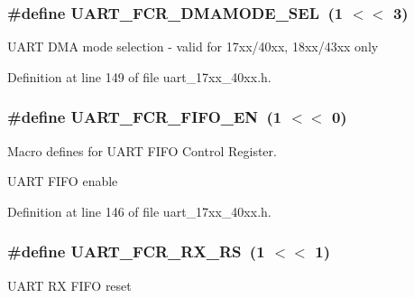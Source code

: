 \subsubsection[{\texorpdfstring{U\+A\+R\+T\+\_\+\+F\+C\+R\+\_\+\+D\+M\+A\+M\+O\+D\+E\+\_\+\+S\+EL}{UART_FCR_DMAMODE_SEL}}]{\setlength{\rightskip}{0pt plus 5cm}\#define U\+A\+R\+T\+\_\+\+F\+C\+R\+\_\+\+D\+M\+A\+M\+O\+D\+E\+\_\+\+S\+EL~(1 $<$$<$ 3)}\hypertarget{group__UART__17XX__40XX_ga996e144f7d08cb36aa729f28d74b5801}{}\label{group__UART__17XX__40XX_ga996e144f7d08cb36aa729f28d74b5801}
U\+A\+RT D\+MA mode selection -\/ valid for 17xx/40xx, 18xx/43xx only 

Definition at line 149 of file uart\+\_\+17xx\+\_\+40xx.\+h.

\subsubsection[{\texorpdfstring{U\+A\+R\+T\+\_\+\+F\+C\+R\+\_\+\+F\+I\+F\+O\+\_\+\+EN}{UART_FCR_FIFO_EN}}]{\setlength{\rightskip}{0pt plus 5cm}\#define U\+A\+R\+T\+\_\+\+F\+C\+R\+\_\+\+F\+I\+F\+O\+\_\+\+EN~(1 $<$$<$ 0)}\hypertarget{group__UART__17XX__40XX_gadec12ecfc7ae1198cee68f2cad982bcb}{}\label{group__UART__17XX__40XX_gadec12ecfc7ae1198cee68f2cad982bcb}


Macro defines for U\+A\+RT F\+I\+FO Control Register. 

U\+A\+RT F\+I\+FO enable 

Definition at line 146 of file uart\+\_\+17xx\+\_\+40xx.\+h.

\subsubsection[{\texorpdfstring{U\+A\+R\+T\+\_\+\+F\+C\+R\+\_\+\+R\+X\+\_\+\+RS}{UART_FCR_RX_RS}}]{\setlength{\rightskip}{0pt plus 5cm}\#define U\+A\+R\+T\+\_\+\+F\+C\+R\+\_\+\+R\+X\+\_\+\+RS~(1 $<$$<$ 1)}\hypertarget{group__UART__17XX__40XX_ga246b37ccd6137c0bb51eb32760cb228e}{}\label{group__UART__17XX__40XX_ga246b37ccd6137c0bb51eb32760cb228e}
U\+A\+RT RX F\+I\+FO reset 

